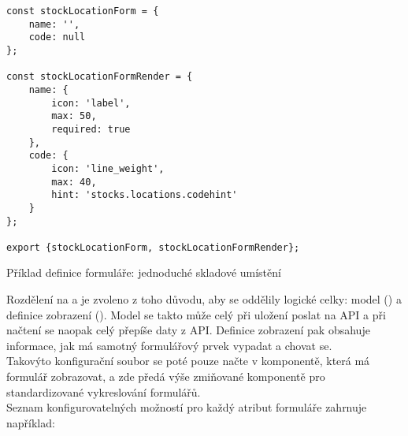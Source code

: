 \begin{listing}[h]
\begin{verbatim}
const stockLocationForm = {
    name: '',
    code: null
};

const stockLocationFormRender = {
    name: {
        icon: 'label',
        max: 50,
        required: true
    },
    code: {
        icon: 'line_weight',
        max: 40,
        hint: 'stocks.locations.codehint'
    }
};

export {stockLocationForm, stockLocationFormRender};
\end{verbatim}
\caption{Příklad definice formuláře: jednoduché skladové umístění} \label{code:formfields:def}
\end{listing}

Rozdělení na  a  je zvoleno z toho důvodu, aby se oddělily logické celky: model () a definice zobrazení (). Model se takto může celý při uložení poslat na API a při načtení se naopak celý přepíše daty z API. Definice zobrazení pak obsahuje informace, jak má samotný formulářový prvek vypadat a chovat se.\\
Takovýto konfigurační soubor se poté pouze načte v komponentě, která má formulář zobrazovat, a zde předá výše zmiňované komponentě pro standardizované vykreslování formulářů.\\
Seznam konfigurovatelných možností pro každý atribut formuláře zahrnuje například:

